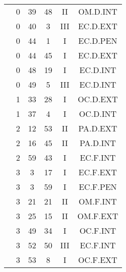 \documentclass[12pt, a4paper]{article}
\begin{document}
\begin{multicols}{3}
{\begin{tabular}{c c c c c c}
	 	 	 	 & 0 & 39 & 48 & II & OM.D.INT\\%
	 	 	 	 & 0 & 40 & 3 & III & EC.D.EXT\\%
	 	 	 	 & 0 & 44 & 1 & I & EC.D.PEN\\%
	 	 	 	 & 0 & 44 & 45 & I & EC.D.EXT\\%
	 	 	 	 & 0 & 48 & 19 & I & EC.D.INT\\%
	 	 	 	 & 0 & 49 & 5 & III & EC.D.INT\\%
	 	 	 	 & 1 & 33 & 28 & I & OC.D.EXT\\%
	 	 	 	 & 1 & 37 & 4 & I & OC.D.INT\\%
	 	 	 	 & 2 & 12 & 53 & II & PA.D.EXT\\%
	 	 	 	 & 2 & 16 & 45 & II & PA.D.INT\\%
	 	 	 	 & 2 & 59 & 43 & I & EC.F.INT\\%
	 	 	 	 & 3 & 3 & 17 & I & EC.F.EXT\\%
	 	 	 	 & 3 & 3 & 59 & I & EC.F.PEN\\%
	 	 	 	 & 3 & 21 & 21 & II & OM.F.INT\\%
	 	 	 	 & 3 & 25 & 15 & II & OM.F.EXT\\%
	 	 	 	 & 3 & 49 & 34 & I & OC.F.INT\\%
	 	 	 	 & 3 & 52 & 50 & III & EC.F.INT\\%
	 	 	 	 & 3 & 53 & 8 & I & OC.F.EXT\\%
	 	 \end{tabular}
 	}
\end{multicols}
\end{document}
